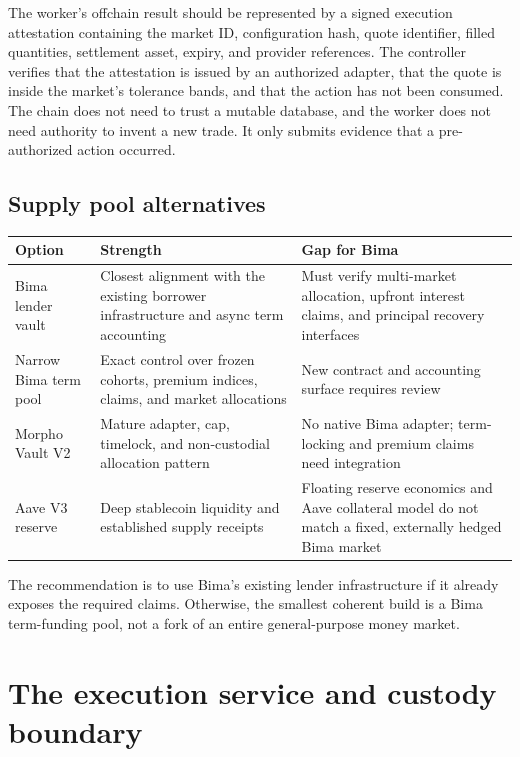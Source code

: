 \documentclass[11pt,oneside]{article}
\begin{document}
The worker's offchain result should be represented by a signed execution
attestation containing the market ID, configuration hash, quote identifier,
filled quantities, settlement asset, expiry, and provider references. The
controller verifies that the attestation is issued by an authorized adapter,
that the quote is inside the market's tolerance bands, and that the action has
not been consumed. The chain does not need to trust a mutable database, and the
worker does not need authority to invent a new trade. It only submits evidence
that a pre-authorized action occurred.

\subsection{Supply pool alternatives}

\begin{center}
\begin{tabularx}{\textwidth}{@{}p{}YY@{}}
\toprule
\textbf{Option} & \textbf{Strength} & \textbf{Gap for Bima} \\
\midrule
 Bima lender vault & Closest alignment with the existing borrower infrastructure and async term accounting & Must verify multi-market allocation, upfront interest claims, and principal recovery interfaces \\
Narrow Bima term pool & Exact control over frozen cohorts, premium indices, claims, and market allocations & New contract and accounting surface requires review \\
Morpho Vault V2 & Mature adapter, cap, timelock, and non-custodial allocation pattern & No native Bima adapter; term-locking and premium claims need integration \\
Aave V3 reserve & Deep stablecoin liquidity and established supply receipts & Floating reserve economics and Aave collateral model do not match a fixed, externally hedged Bima market \\
\bottomrule
\end{tabularx}
\end{center}

The recommendation is to use Bima's existing lender infrastructure if it already exposes the required claims. Otherwise, the smallest coherent build is a Bima term-funding pool, not a fork of an entire general-purpose money market.

\section{The execution service and custody boundary}
\end{document}
